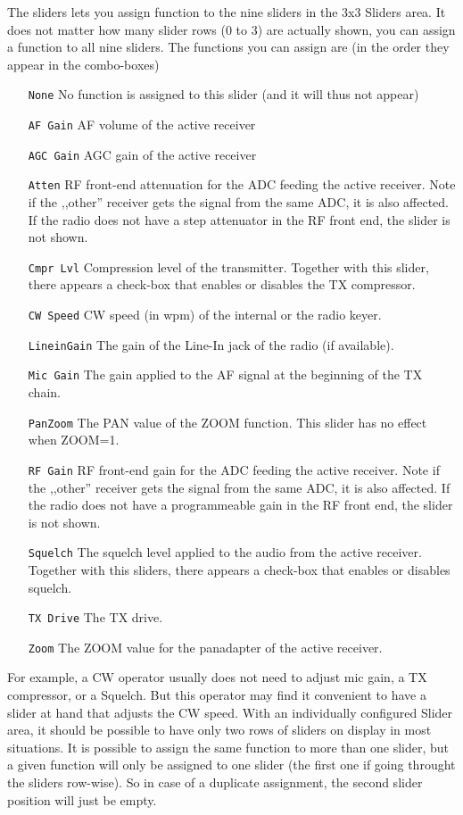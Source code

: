 \documentclass[12pt]{book}
\def\rett#1{\texttt{\color{red}#1}}
\begin{document}
The sliders lets you assign function to the nine sliders in the 3x3 Sliders area. It does not matter
how many slider rows (0 to 3) are actually shown, you can assign a function to all nine sliders.
The functions you can assign are (in the order they appear in the combo-boxes)
\begin{itemize}
\item[\rett{None}]{No function is assigned to this slider (and it will thus not appear)}
\item[\rett{AF Gain}]{AF volume of the active receiver}
\item[\rett{AGC Gain}]{AGC gain of the active receiver}
\item[\rett{Atten}]{RF front-end attenuation for the ADC feeding the active receiver. Note if the ,,other''
receiver gets the signal from the same ADC, it is also affected. If the radio does not have a step attenuator
in the RF front end, the slider is not shown.} 
\item[\rett{Cmpr Lvl}]{Compression level of the transmitter. Together with this slider, there appears a
check-box that enables or disables the TX compressor.}
\item[\rett{CW Speed}]{CW speed (in wpm) of the internal or the radio keyer.}
\item[\rett{LineinGain}]{The gain of the Line-In jack of the radio (if available).}
\item[\rett{Mic Gain}]{The gain applied to the AF signal at the beginning of the TX chain.}
\item[\rett{PanZoom}]{The PAN value of the ZOOM function. This slider has no effect when ZOOM=1.}
\item[\rett{RF Gain}]{RF front-end gain for the ADC feeding the active receiver. Note if the ,,other''
receiver gets the signal from the same ADC, it is also affected. If the radio does not have a programmeable
gain in the RF front end, the slider is not shown.}
\item[\rett{Squelch}]{The squelch level applied to the audio from the active receiver. Together with this
sliders, there appears a check-box that enables or disables squelch.}
\item[\rett{TX Drive}]{The TX drive.}
\item[\rett{Zoom}]{The ZOOM value for the panadapter of the active receiver.}
\end{itemize}

For example, a CW operator usually does not need to adjust mic gain, a TX compressor, or a Squelch. But
this operator may find it convenient to have a slider at hand that adjusts the CW speed. With an
individually configured Slider area, it should be possible to have only two rows of sliders on display
in most situations. It is possible to assign the same function to more than one slider, but a given
function will only be assigned to one slider (the first one if going throught the sliders row-wise).
So in case of a duplicate assignment, the second slider position will just be empty.
\end{document}
